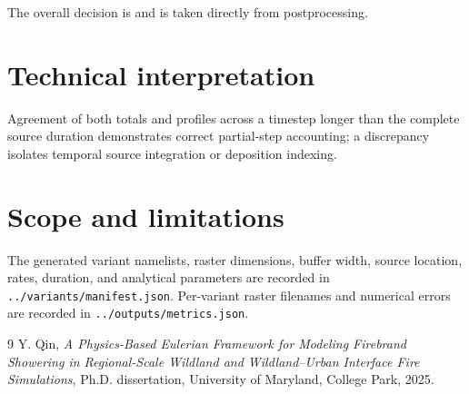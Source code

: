 The overall decision is \textbf{} and is taken directly from postprocessing.

\section{Technical interpretation}
Agreement of both totals and profiles across a timestep longer than the complete source duration demonstrates correct partial-step accounting; a discrepancy isolates temporal source integration or deposition indexing.

\section{Scope and limitations}
The generated variant namelists, raster dimensions, buffer width, source
location, rates, duration, and analytical parameters are recorded in
\texttt{../variants/manifest.json}. Per-variant raster filenames and numerical
errors are recorded in \texttt{../outputs/metrics.json}.

\begin{thebibliography}{9}
Y. Qin, \emph{A Physics-Based Eulerian Framework for Modeling Firebrand
Showering in Regional-Scale Wildland and Wildland--Urban Interface Fire
Simulations}, Ph.D. dissertation, University of Maryland, College Park, 2025.
\end{thebibliography}
